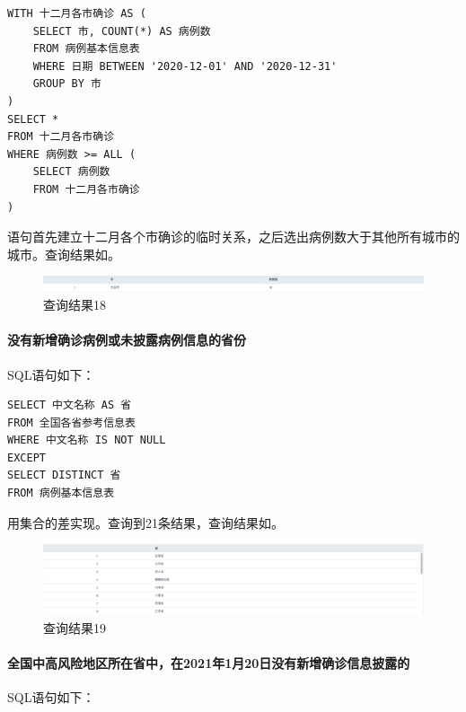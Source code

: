 \documentclass[lang=cn,11pt,a4paper,cite=authornum]{paper}
\begin{document}
\begin{code}
\begin{verbatim}
WITH 十二月各市确诊 AS (
    SELECT 市, COUNT(*) AS 病例数
    FROM 病例基本信息表
    WHERE 日期 BETWEEN '2020-12-01' AND '2020-12-31'
    GROUP BY 市
)
SELECT *
FROM 十二月各市确诊
WHERE 病例数 >= ALL (
    SELECT 病例数
    FROM 十二月各市确诊
)
\end{verbatim}
\end{code}

语句首先建立十二月各个市确诊的临时关系，之后选出病例数大于其他所有城市的城市。查询结果如。

\begin{figure}[!htb]
    \centering
    \includegraphics[width=\textwidth]{./images/lab1_query18.png}
    \caption{查询结果18\label{fig:query18}}
\end{figure}

\paragraph{没有新增确诊病例或未披露病例信息的省份} SQL语句如下：

\begin{code}
\begin{verbatim}
SELECT 中文名称 AS 省
FROM 全国各省参考信息表
WHERE 中文名称 IS NOT NULL 
EXCEPT
SELECT DISTINCT 省
FROM 病例基本信息表
\end{verbatim}
\end{code}

用集合的差实现。查询到21条结果，查询结果如。

\begin{figure}[!htb]
    \centering
    \includegraphics[width=\textwidth]{./images/lab1_query19.png}
    \caption{查询结果19\label{fig:query19}}
\end{figure}

\paragraph{全国中高风险地区所在省中，在2021年1月20日没有新增确诊信息披露的} SQL语句如下：
\end{document}
